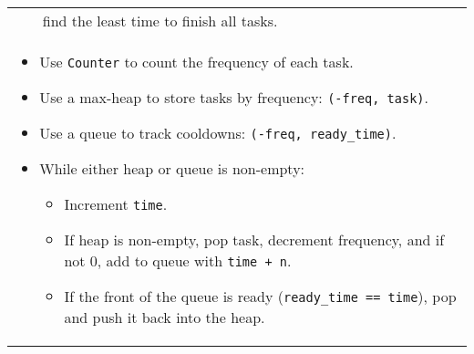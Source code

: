 \begin{summary}
\begin{center}
\begin{tabular}{ll}
            & find the least time to finish all tasks. \\
            \multicolumn{2}{p{\linewidth}}{
                \begin{itemize}
                    \item Use \texttt{Counter} to count the frequency of each task.
                    \item Use a max-heap to store tasks by frequency: \texttt{(-freq, task)}.
                    \item Use a queue to track cooldowns: \texttt{(-freq, ready\_time)}.
                    \item While either heap or queue is non-empty:
                    \begin{itemize}[noitemsep]
                        \item Increment \texttt{time}.
                        \item If heap is non-empty, pop task, decrement frequency, and if not 0, add to queue with \texttt{time + n}.
                        \item If the front of the queue is ready (\texttt{ready\_time == time}), pop and push it back into the heap.
                    \end{itemize}
                \end{itemize}
                } \\
        \end{tabular}
    \end{center}
\end{summary}
